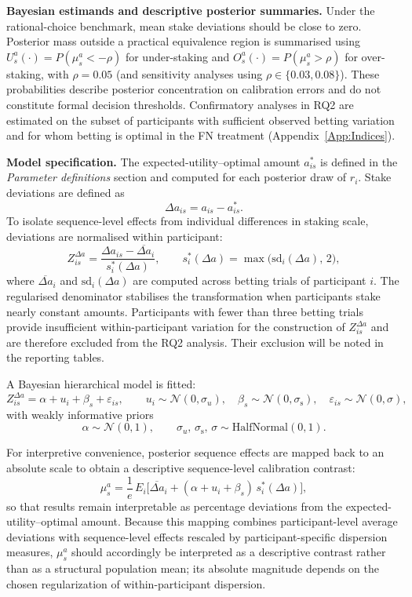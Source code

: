 \documentclass[11pt,a4paper]{article}
\numberwithin{equation}{section}
\begin{document}
\textbf{Bayesian estimands and descriptive posterior summaries.}
Under the rational-choice benchmark, mean stake deviations should be close to zero.  
Posterior mass outside a practical equivalence region is summarised using 
$U^{a}_s(\cdot) = P(\mu_s^{a} < -\rho)$ for under-staking and 
$O^{a}_s(\cdot) = P(\mu_s^{a} > \rho)$ for over-staking, 
with $\rho = 0.05$ (and sensitivity analyses using $\rho \in \{0.03,0.08\}$).  
These probabilities describe posterior concentration on calibration errors and do not constitute formal decision thresholds.
Confirmatory analyses in RQ2 are estimated on the subset of participants with
sufficient observed betting variation and for whom betting is optimal in the FN
treatment (Appendix~\ref{App:Indices}).

\textbf{Model specification.}
The expected-utility--optimal amount $a^{*}_{is}$ is defined in the \emph{Parameter definitions} section and computed for each posterior draw of $r_i$.  
Stake deviations are defined as
\[
\Delta a_{is} = a_{is} - a^{*}_{is}.
\]
To isolate sequence-level effects from individual differences in staking scale, deviations are normalised within participant:
\[
Z^{\Delta a}_{is}
= \frac{\Delta a_{is} - \overline{\Delta a}_i}{s_i^{\ast}(\Delta a)}, 
\qquad
s_i^{\ast}(\Delta a) = \max\!\big(\mathrm{sd}_i(\Delta a),\,2\big),
\]
where $\overline{\Delta a}_i$ and $\mathrm{sd}_i(\Delta a)$ are computed across betting trials of participant $i$.  
The regularised denominator stabilises the transformation when participants stake nearly constant amounts.  
Participants with fewer than three betting trials provide insufficient within-participant variation for the construction of \(Z^{\Delta a}_{is}\) and are therefore excluded from the RQ2 analysis. Their exclusion will be noted in the reporting tables.

A Bayesian hierarchical model is fitted:
\[
Z^{\Delta a}_{is}
= \alpha + u_i + \beta_s + \varepsilon_{is},
\qquad
u_i \sim \mathcal{N}(0,\sigma_{u}),\quad
\beta_s \sim \mathcal{N}(0,\sigma_{\mathrm{s}}),\quad
\varepsilon_{is} \sim \mathcal{N}(0,\sigma),
\]
with weakly informative priors
\[
\alpha \sim \mathcal{N}(0,1),
\qquad
\sigma_{u},\,\sigma_{\mathrm{s}},\,\sigma \sim \mathrm{HalfNormal}(0,1).
\]

For interpretive convenience, posterior sequence effects are mapped back to an
absolute scale to obtain a descriptive sequence-level calibration contrast:
\[
\mu_s^{a}
= \frac{1}{e}\,
E_i\!\big[
\overline{\Delta a}_i
+ (\alpha + u_i + \beta_s)\,s_i^{\ast}(\Delta a)
\big],
\]
so that results remain interpretable as percentage deviations from the expected-utility--optimal amount.
Because this mapping combines participant-level average deviations with
sequence-level effects rescaled by participant-specific dispersion measures,
$\mu_s^{a}$ should accordingly be interpreted as a descriptive contrast rather than as a
structural population mean; its absolute magnitude depends on the chosen
regularization of within-participant dispersion.
\end{document}
